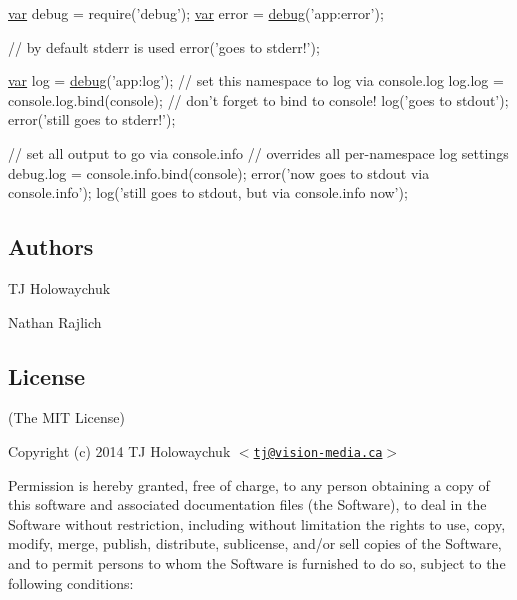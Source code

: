 \begin{DoxyCode}
\hyperlink{018__def_8c_a335628f2e9085305224b4f9cc6e95ed5}{var} debug = require(\textcolor{stringliteral}{'debug'});
\hyperlink{018__def_8c_a335628f2e9085305224b4f9cc6e95ed5}{var} error = \hyperlink{addon_2doxmlparser_2src_2debug_8cpp_a0a777024bcc965d6200d9599eb187cd9}{debug}(\textcolor{stringliteral}{'app:error'});

\textcolor{comment}{// by default stderr is used}
error(\textcolor{stringliteral}{'goes to stderr!'});

\hyperlink{018__def_8c_a335628f2e9085305224b4f9cc6e95ed5}{var} log = \hyperlink{addon_2doxmlparser_2src_2debug_8cpp_a0a777024bcc965d6200d9599eb187cd9}{debug}(\textcolor{stringliteral}{'app:log'});
\textcolor{comment}{// set this namespace to log via console.log}
log.log = console.log.bind(console); \textcolor{comment}{// don't forget to bind to console!}
log(\textcolor{stringliteral}{'goes to stdout'});
error(\textcolor{stringliteral}{'still goes to stderr!'});

\textcolor{comment}{// set all output to go via console.info}
\textcolor{comment}{// overrides all per-namespace log settings}
debug.log = console.info.bind(console);
error(\textcolor{stringliteral}{'now goes to stdout via console.info'});
log(\textcolor{stringliteral}{'still goes to stdout, but via console.info now'});
\end{DoxyCode}


\subsection*{Authors}


\begin{DoxyItemize}
\item T\+J Holowaychuk
\item Nathan Rajlich
\end{DoxyItemize}

\subsection*{License}

(The M\+I\+T License)

Copyright (c) 2014 T\+J Holowaychuk $<$\href{mailto:tj@vision-media.ca}{\tt tj@vision-\/media.\+ca}$>$

Permission is hereby granted, free of charge, to any person obtaining a copy of this software and associated documentation files (the \textquotesingle{}Software\textquotesingle{}), to deal in the Software without restriction, including without limitation the rights to use, copy, modify, merge, publish, distribute, sublicense, and/or sell copies of the Software, and to permit persons to whom the Software is furnished to do so, subject to the following conditions\+:

